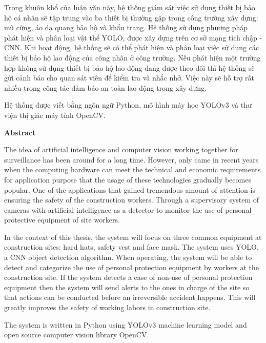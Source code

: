 \documentclass[12pt]{report}
\begin{document}
Trong khuôn khổ của luận văn này, hệ thống giám sát việc sử dụng thiết bị bảo hộ cá nhân 
sẽ tập trung vào ba thiết bị thường gặp trong công trường xây dựng: mũ cứng, áo dạ quang 
bảo hộ và khẩu trang. Hệ thống sử dụng phương pháp phát hiện và phân loại vật thể YOLO, 
được xây dựng trên cơ sở mạng tích chập - CNN. Khi hoạt động, hệ thống sẽ có thể phát hiện 
và phân loại việc sử dụng các thiết bị bảo hộ lao động của công nhân ở công trường. Nếu phát 
hiện một trường hợp không sử dụng thiết bị bảo hộ lao động đang được theo dõi thì hệ thống 
sẽ gửi cảnh báo cho quan sát viên để kiểm tra và nhắc nhở. Việc này sẽ hỗ trợ rất nhiều trong 
công tác đảm bảo an toàn lao động trong xây dựng.

Hệ thống được viết bằng ngôn ngữ Python, mô hình máy học YOLOv3 và thư viện thị giác máy tính 
OpenCV.

\clearpage

\newpage
%
\pagestyle{empty}
\begin{center}
{\LARGE\bfseries Abstract}
\end{center}
The idea of artificial intelligence and computer vision working together for surveillance has been around for a long time. However, only came in recent years when the computing hardware can meet the technical and economic requirements for application purpose that the usage of these technologies gradually becomes popular. One of the applications that gained tremendous amount of attention is ensuring the safety of the construction workers. Through a supervisory system of cameras with artificial intelligence as a detector to monitor the use of personal protective equipment of site workers. 

In the context of this thesis, the system will focus on three common equipment at construction sites: hard hats, safety vest and face mask. The system uses YOLO, a CNN object detection algorithm. When operating, the system will be able to detect and categorize the use of personal protection equipment by workers at the construction site. If the system detects a case of non-use of personal protection equipment then the system will send alerts to the ones in charge of the site so that actions can be conducted before an irreversible accident happens. This will greatly improves the safety of working labors in construction site.

The system is written in Python using YOLOv3 machine learning model and open source computer vision library OpenCV.

\clearpage    
{
\pagestyle{empty}
\tableofcontents
\clearpage
\listoffigures
\clearpage
\listoftables
\clearpage
}

%
{
\pagestyle{fancy}
\newpage\cleardoublepage
\newpage\cleardoublepage
\newpage\cleardoublepage
\newpage\cleardoublepage
\newpage\cleardoublepage

\nocite{*}
\newpage\cleardoublepage

}
\end{document}
